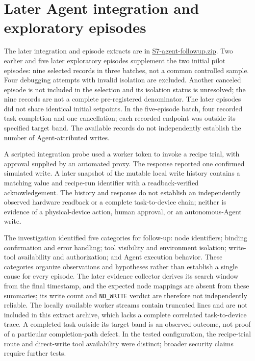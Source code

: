 \documentclass[10pt]{article}
\begin{document}
\section*{Later Agent integration and exploratory episodes}
The later integration and episode extracts are in \url{S7-agent-followup.zip}. Two earlier and five later exploratory episodes supplement the two initial pilot episodes: nine selected records in three batches, not a common controlled sample. Four debugging attempts with invalid isolation are excluded. Another canceled episode is not included in the selection and its isolation status is unresolved; the nine records are not a complete pre-registered denominator. The later episodes did not share identical initial setpoints. In the five-episode batch, four recorded task completion and one cancellation; each recorded endpoint was outside its specified target band. The available records do not independently establish the number of Agent-attributed writes.

A scripted integration probe used a worker token to invoke a recipe trial, with approval supplied by an automated proxy. The response reported one confirmed simulated write. A later snapshot of the mutable local write history contains a matching value and recipe-run identifier with a readback-verified acknowledgement. The history and response do not establish an independently observed hardware readback or a complete task-to-device chain; neither is evidence of a physical-device action, human approval, or an autonomous-Agent write.

The investigation identified five categories for follow-up: node identifiers; binding confirmation and error handling; tool visibility and environment isolation; write-tool availability and authorization; and Agent execution behavior. These categories organize observations and hypotheses rather than establish a single cause for every episode. The later evidence collector derives its search window from the final timestamp, and the expected node mappings are absent from these summaries; its write count and \texttt{NO\_WRITE} verdict are therefore not independently reliable. The locally available worker streams contain truncated lines and are not included in this extract archive, which lacks a complete correlated task-to-device trace. A completed task outside its target band is an observed outcome, not proof of a particular completion-path defect. In the tested configuration, the recipe-trial route and direct-write tool availability were distinct; broader security claims require further tests.
\end{document}
